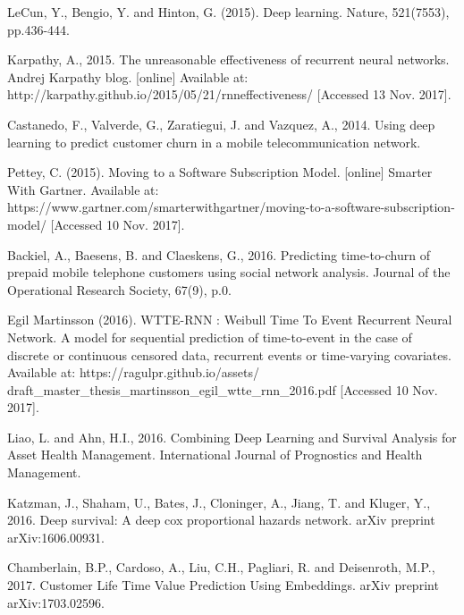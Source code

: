 \documentclass[final,a4paper,peerreviewca]{IEEEtran}
\begin{document}

\begin{thebibliography}{99} %

LeCun, Y., Bengio, Y. and Hinton, G. (2015). 
\newblock Deep learning. Nature, 521(7553), pp.436-444.

 Karpathy, A., 2015. The unreasonable effectiveness of recurrent neural networks. Andrej Karpathy blog. [online] Available at: http://karpathy.github.io/2015/05/21/rnn\-effectiveness/ [Accessed 13 Nov. 2017].

 Castanedo, F., Valverde, G., Zaratiegui, J. and Vazquez, A., 2014. Using deep learning to predict customer churn in a mobile telecommunication network.

 Pettey, C. (2015). Moving to a Software Subscription Model. [online] Smarter With Gartner. Available at: https://www.gartner.com/smarterwithgartner/moving-to-a-software-subscription-model/ [Accessed 10 Nov. 2017].

 Backiel, A., Baesens, B. and Claeskens, G., 2016. Predicting time-to-churn of prepaid mobile telephone customers using social network analysis. Journal of the Operational Research Society, 67(9), p.0.

Egil Martinsson (2016).
\newblock WTTE-RNN : Weibull Time To Event Recurrent Neural Network. A model for sequential prediction of time-to-event in the case of discrete or continuous censored data, recurrent events or time-varying covariates. Available at: https://ragulpr.github.io/assets/
draft\_master\_thesis\_martinsson\_egil\_wtte\_rnn\_2016.pdf  [Accessed 10 Nov. 2017].

 Liao, L. and Ahn, H.I., 2016. Combining Deep Learning and Survival Analysis for Asset Health Management. International Journal of Prognostics and Health Management.

 Katzman, J., Shaham, U., Bates, J., Cloninger, A., Jiang, T. and Kluger, Y., 2016. Deep survival: A deep cox proportional hazards network. arXiv preprint arXiv:1606.00931.

 Chamberlain, B.P., Cardoso, A., Liu, C.H., Pagliari, R. and Deisenroth, M.P., 2017. Customer Life Time Value Prediction Using Embeddings. arXiv preprint arXiv:1703.02596.


\end{thebibliography}
\end{document}
